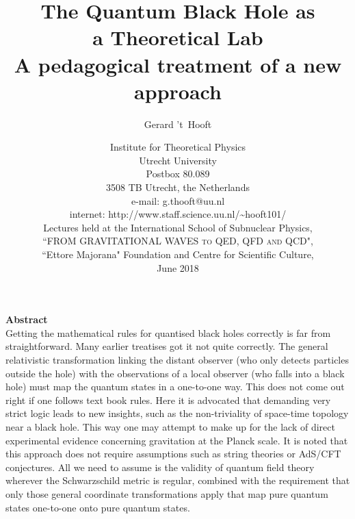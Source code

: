 \documentclass[12pt]{article}
\begin{document}
\begin{titlepage}
 \title{{ \LARGE\textbf {The Quantum Black Hole as\\[5pt] a Theoretical Lab\\[10pt]}}
	{\large\textbf{ A pedagogical treatment of a new approach}}}
		\author{Gerard 't~Hooft}
\date{\small  Institute for Theoretical Physics \\ Utrecht University  \\[10pt]
 Postbox 80.089 \\ 3508 TB Utrecht, the Netherlands  \\[10pt]
e-mail:  g.thooft@uu.nl \\ internet: 
http://www.staff.science.uu.nl/\~{}hooft101/  \\[10pt]
{Lectures held at the International School of
	Subnuclear Physics,\\ \textsc{``FROM GRAVITATIONAL WAVES to QED, QFD and QCD"},\\
	``Ettore Majorana" Foundation and Centre for Scientific Culture,\\June 2018}\\[10pt]
}
 \maketitle
\noindent \textbf{Abstract}\\ [10pt]
	Getting the mathematical rules for quantised black holes correctly is far from straightforward. Many earlier treatises got it not quite correctly. The general relativistic transformation linking the distant observer (who only detects particles outside the hole) with the observations of a local observer (who falls into a black hole) must map the quantum states in a one-to-one way. This does not come out right if one follows text book rules. Here it is advocated that demanding very strict logic leads to new insights, such as the non-triviality of space-time topology near a black hole. This way one may attempt to make up for the lack of direct experimental evidence concerning gravitation at the Planck scale.
	It is noted that this approach does not require assumptions such as string theories or AdS/CFT conjectures. All we need to assume is the validity of quantum field theory wherever the Schwarzschild metric is regular, combined with the requirement that only those general coordinate transformations apply that map pure quantum states one-to-one onto pure quantum states.

 \end{titlepage}							
  \setcounter{page}{2}
  
\end{document}
